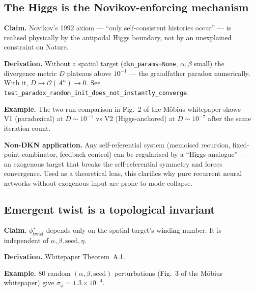 \documentclass[11pt,a4paper]{article}
\theoremstyle{definition}
\newcommand{\phitwist}{\phi_{\mathrm{twist}}}
\newcommand{\contr}{A}
\begin{document}
\subsection{The Higgs is the Novikov-enforcing mechanism}\label{nov:3}

\begin{tcolorbox}[noveltybox]
\textbf{Claim.} Novikov's 1992 axiom --- ``only self-consistent
histories occur'' --- is realised physically by the antipodal Higgs
boundary, not by an unexplained constraint on Nature.
\end{tcolorbox}

\textbf{Derivation.} Without a spatial target (\texttt{dkn\_params=None},
$\alpha,\beta$ small) the divergence metric
$D$ plateaus above $10^{-1}$ --- the grandfather paradox numerically.
With it, $D \to \mathcal{O}(\contr^n) \to 0$. See
\texttt{test\_paradox\_random\_init\_does\_not\_instantly\_converge}.

\textbf{Example.} The two-run comparison in Fig.~2 of the M\"obius
whitepaper shows V1 (paradoxical) at $D \sim 10^{-1}$ vs V2
(Higgs-anchored) at $D \sim 10^{-7}$ after the same iteration count.

\begin{tcolorbox}[applbox]
\textbf{Non-DKN application.}
Any self-referential system (memoised recursion, fixed-point
combinator, feedback control) can be regularised by a ``Higgs
analogue'' --- an exogenous target that breaks the self-referential
symmetry and forces convergence. Used as a theoretical lens, this
clarifies why pure recurrent neural networks without exogenous input
are prone to mode collapse.
\end{tcolorbox}

\subsection{Emergent twist is a topological invariant}\label{nov:4}

\begin{tcolorbox}[noveltybox]
\textbf{Claim.} $\phitwist^\star$ depends only on the spatial target's
winding number. It is independent of $\alpha,\beta,\text{seed},\eta$.
\end{tcolorbox}

\textbf{Derivation.} Whitepaper Theorem~A.1.

\textbf{Example.} 80 random $(\alpha,\beta,\text{seed})$ perturbations
(Fig.~3 of the M\"obius whitepaper) give
$\sigma_\phi = 1.3\times 10^{-4}$.
\end{document}
